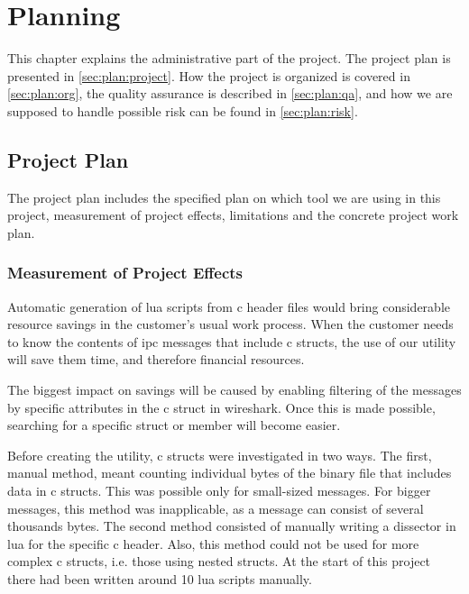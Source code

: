 \chapter{Planning}
This chapter explains the administrative part of the project. The project plan 
is presented in \autoref{sec:plan:project}. How the project is organized is 
covered in \autoref{sec:plan:org}, the quality assurance is described in 
\autoref{sec:plan:qa}, and how we are supposed to handle possible risk can be 
found in \autoref{sec:plan:risk}.

\section{Project Plan}
\label{sec:plan:project}
The project plan includes the specified plan on which tool we are using in this project, measurement of project effects, limitations and the concrete project work plan.

\subsection{Measurement of Project Effects}
Automatic generation of \Gls{lua} \glspl{script} from \Gls{c} \gls{header} files would bring considerable resource savings in the customer's usual work process.
When the customer needs to know the contents of \gls{ipc} messages that include \Gls{c} \glspl{struct}, the use of our utility will save them time, and therefore financial resources.

The biggest impact on savings will be caused by enabling filtering of the messages by specific attributes in the \Gls{c} \gls{struct} in \Gls{wireshark}. Once this is made possible, searching for a specific \gls{struct} or \gls{member} will become easier.

Before creating the utility, \Gls{c} \glspl{struct} were investigated in two ways. The first, manual method, meant counting individual bytes of the \gls{binary} file that includes data in \Gls{c} \glspl{struct}. This was possible only for small-sized messages. For bigger messages, this method was inapplicable, as a message can consist of several thousands bytes. The second method consisted of manually writing a \gls{dissector} in \Gls{lua} for the specific \Gls{c} \gls{header}. Also, this method could not be used for more complex \Gls{c} \glspl{struct}, i.e. those using \glspl{nested struct}. At the start of this project there had been written around 10 \Gls{lua} \glspl{script} manually.

